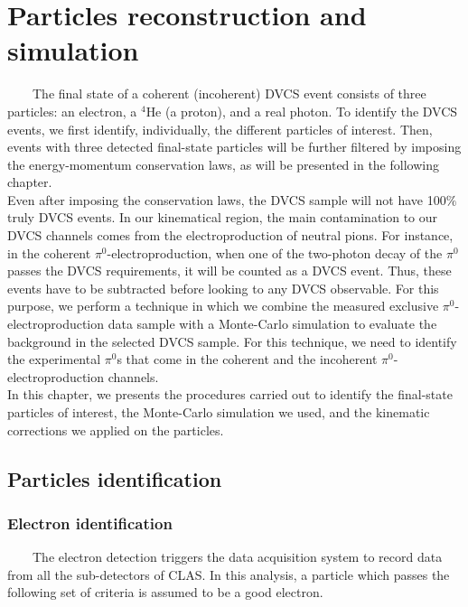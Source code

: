 \chapter{Particles reconstruction and simulation}
~~~~The final state of a coherent (incoherent) DVCS event consists of three particles: an electron, a $^4$He (a proton), and a real photon. To identify the DVCS events, we first identify, individually, the different particles of interest. Then, events with three detected final-state particles will be further filtered by imposing the energy-momentum conservation laws, as will be presented in the following chapter.\\ 


Even after imposing the conservation laws, the DVCS sample will not have 100$\%$ truly DVCS events. In our kinematical region, the main contamination to our DVCS channels comes from the electroproduction of neutral pions. For instance, in the coherent $\pi^0$-electroproduction, when one of the two-photon decay of the $\pi^{0}$ passes the DVCS requirements, it will be counted as a DVCS event. Thus, these events have to be subtracted before looking to any DVCS observable. For this purpose, we perform a technique in which we combine the measured exclusive $\pi^0$-electroproduction data sample with a Monte-Carlo simulation to evaluate the background in the selected DVCS sample. For this technique, we need to identify the experimental $\pi^0$s that come in the coherent and the incoherent $\pi^0$-electroproduction channels.\\
 
 
In this chapter, we presents the procedures carried out to identify the final-state particles of interest, the Monte-Carlo simulation we used, and the kinematic corrections we applied on the particles.

\section{Particles identification}
     
\subsection{Electron identification} \label{Electron_identification}
~~~~The electron detection triggers the data acquisition system to record data from all the sub-detectors of CLAS. In this analysis, a particle which passes the following set of criteria is assumed to be a good electron.
  
